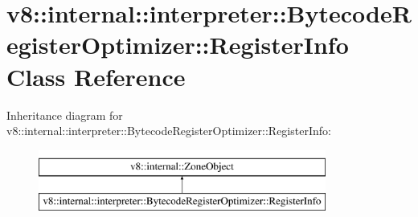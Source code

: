 \hypertarget{classv8_1_1internal_1_1interpreter_1_1BytecodeRegisterOptimizer_1_1RegisterInfo}{}\section{v8\+:\+:internal\+:\+:interpreter\+:\+:Bytecode\+Register\+Optimizer\+:\+:Register\+Info Class Reference}
\label{classv8_1_1internal_1_1interpreter_1_1BytecodeRegisterOptimizer_1_1RegisterInfo}
Inheritance diagram for v8\+:\+:internal\+:\+:interpreter\+:\+:Bytecode\+Register\+Optimizer\+:\+:Register\+Info\+:\begin{figure}[H]
\begin{center}
\leavevmode
\includegraphics[height=2.000000cm]{classv8_1_1internal_1_1interpreter_1_1BytecodeRegisterOptimizer_1_1RegisterInfo}
\end{center}
\end{figure}
